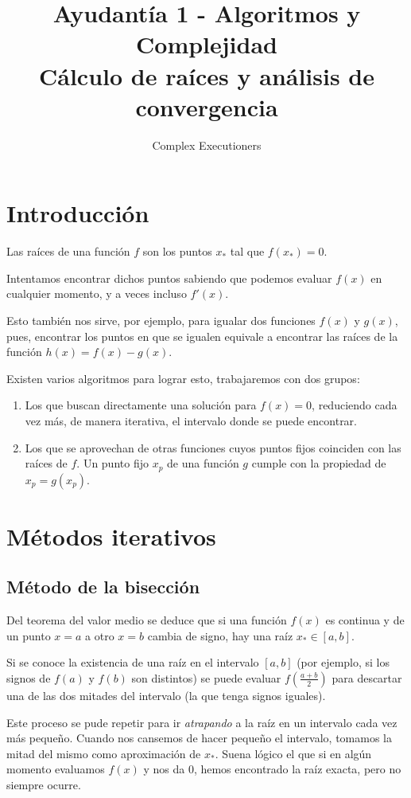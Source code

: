 \documentclass[spanish, fleqn]{article}
\title{Ayudantía 1 - Algoritmos y Complejidad\\
Cálculo de raíces y análisis de convergencia}
\author{Complex Executioners}
\date{}
\begin{document}
\maketitle

\thispagestyle{empty}
\section{Introducción}
Las raíces de una función $f$ son los puntos $x_*$ tal que $f(x_*)=0$.

Intentamos encontrar dichos puntos sabiendo que podemos evaluar $f(x)$ en cualquier momento, y a veces incluso $f'(x)$.

Esto también nos sirve, por ejemplo, para igualar dos funciones $f(x)$ y $g(x)$, pues, encontrar los puntos en que se igualen equivale a encontrar las raíces de la función $h(x)=f(x)-g(x)$.

Existen varios algoritmos para lograr esto, trabajaremos con dos grupos:
\begin{enumerate}
\item Los que buscan directamente una solución para $f(x)=0$, reduciendo cada vez más, de manera iterativa, el intervalo donde se puede encontrar.
\item Los que se aprovechan de otras funciones cuyos puntos fijos coinciden con las raíces de $f$. Un punto fijo $x_p$ de una función $g$ cumple con la propiedad de $x_p=g(x_p)$.
\end{enumerate}

\section{Métodos iterativos}

\subsection{Método de la bisección}

Del teorema del valor medio se deduce que si una función $f(x)$ es continua y de un punto $x=a$ a otro $x=b$ cambia de signo, hay una raíz $x_* \in [a,b]$.

Si se conoce la existencia de una raíz en el intervalo $[a,b]$ (por ejemplo, si los signos de $f(a)$ y $f(b)$ son distintos) se puede evaluar $f(\frac{a+b}{2})$ para descartar una de las dos mitades del intervalo (la que tenga signos iguales).

Este proceso se pude repetir para ir \emph{atrapando} a la raíz en un intervalo cada vez más pequeño. Cuando nos cansemos de hacer pequeño el intervalo, tomamos la mitad del mismo como aproximación de $x_*$. Suena lógico el que si en algún momento evaluamos $f(x)$ y nos da $0$, hemos encontrado la raíz exacta, pero no siempre ocurre.
\end{document}
